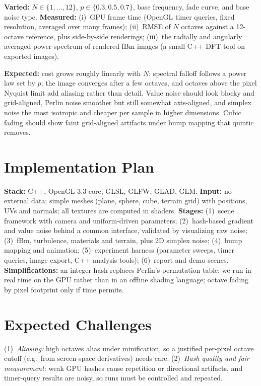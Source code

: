 \documentclass[acmlarge,nonacm]{acmart}
\begin{document}
\textbf{Varied:} $N\in\{1,\dots,12\}$, $p\in\{0.3,0.5,0.7\}$, base frequency, fade curve, and base noise type. \textbf{Measured:} (i)~GPU frame time (OpenGL timer queries, fixed resolution, averaged over many frames); (ii)~RMSE of $N$ octaves against a 12-octave reference, plus side-by-side renderings; (iii)~the radially and angularly averaged power spectrum of rendered fBm images (a small C++ DFT tool on exported images).

\textbf{Expected:} cost grows roughly linearly with $N$; spectral falloff follows a power law set by $p$; the image converges after a few octaves, and octaves above the pixel Nyquist limit add aliasing rather than detail. Value noise should look blocky and grid-aligned, Perlin noise smoother but still somewhat axis-aligned, and simplex noise the most isotropic and cheaper per sample in higher dimensions. Cubic fading should show faint grid-aligned artifacts under bump mapping that quintic removes.

\section{Implementation Plan}\label{sec:plan}
\textbf{Stack:} C++, OpenGL 3.3 core, GLSL, GLFW, GLAD, GLM. \textbf{Input:} no external data; simple meshes (plane, sphere, cube, terrain grid) with positions, UVs and normals; all textures are computed in shaders.
\textbf{Stages:} (1)~scene framework with camera and uniform-driven parameters; (2)~hash-based gradient and value noise behind a common interface, validated by visualizing raw noise; (3)~fBm, turbulence, materials and terrain, plus 2D simplex noise; (4)~bump mapping and animation; (5)~experiment harness (parameter sweeps, timer queries, image export, C++ analysis tools); (6)~report and demo scenes.
\textbf{Simplifications:} an integer hash replaces Perlin's permutation table; we run in real time on the GPU rather than in an offline shading language; octave fading by pixel footprint only if time permits.

\section{Expected Challenges}\label{sec:challenges}
(1)~\emph{Aliasing:} high octaves alias under minification, so a justified per-pixel octave cutoff (e.g.\ from screen-space derivatives) needs care. (2)~\emph{Hash quality and fair measurement:} weak GPU hashes cause repetition or directional artifacts, and timer-query results are noisy, so runs must be controlled and repeated.
\end{document}
